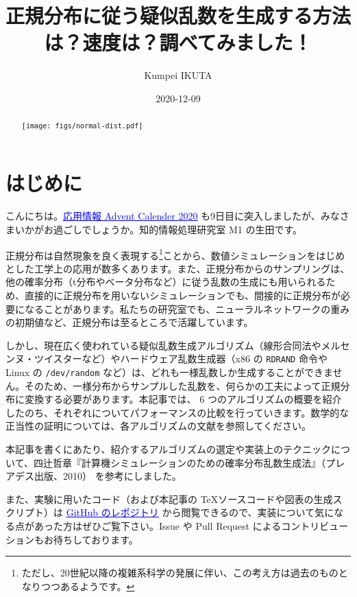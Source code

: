 \documentclass[twocolumn, dvipdfmx]{jsarticle}
\begin{document}
\title{正規分布に従う疑似乱数を生成する方法は？速度は？調べてみました！}
\author{Kumpei IKUTA}
\date{2020-12-09}

\renewcommand{\abstractname}{}
\begin{abstract}
\centering
\texttt{[image: figs/normal-dist.pdf]}
\end{abstract}

\maketitle

\section*{はじめに}

こんにちは。\href{https://adventar.org/calendars/5671}{\textcolor{blue}{\underline{応用情報 Advent Calender 2020}}} も9日目に突入しましたが、みなさまいかがお過ごしでしょうか。知的情報処理研究室 M1 の生田です。

正規分布は自然現象を良く表現する\footnote{ただし、20世紀以降の複雑系科学の発展に伴い、この考え方は過去のものとなりつつあるようです。}ことから、数値シミュレーションをはじめとした工学上の応用が数多くあります。また、正規分布からのサンプリングは、他の確率分布（t分布やベータ分布など）に従う乱数の生成にも用いられるため、直接的に正規分布を用いないシミュレーションでも、間接的に正規分布が必要になることがあります。私たちの研究室でも、ニューラルネットワークの重みの初期値など、正規分布は至るところで活躍しています。

しかし、現在広く使われている疑似乱数生成アルゴリズム（線形合同法やメルセンヌ・ツイスターなど）やハードウェア乱数生成器（x86 の \texttt{RDRAND} 命令や Linux の \texttt{/dev/random} など）は、どれも一様乱数しか生成することができません。そのため、一様分布からサンプルした乱数を、何らかの工夫によって正規分布に変換する必要があります。本記事では、 6 つのアルゴリズムの概要を紹介したのち、それぞれについてパフォーマンスの比較を行っていきます。数学的な正当性の証明については、各アルゴリズムの文献を参照してください。

本記事を書くにあたり、紹介するアルゴリズムの選定や実装上のテクニックについて、四辻哲章『計算機シミュレーションのための確率分布乱数生成法』（プレアデス出版、2010）\cite{yotsuji2010} を参考にしました。

また、実験に用いたコード（および本記事の \TeX ソースコードや図表の生成スクリプト）は \href{https://github.com/ikr7/benchmark-normal-variates}{\textcolor{blue}{\underline{GitHub のレポジトリ}}} から閲覧できるので、実装について気になる点があった方はぜひご覧下さい。Issue や Pull Request によるコントリビューションもお待ちしております。
\end{document}
